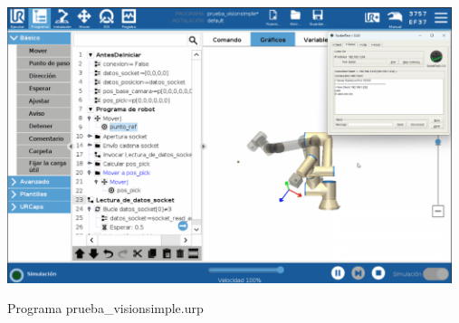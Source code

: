   \begin{table}[H]
     \centering
     \begin{center}
       \includegraphics[width=130mm]{figs/prueba_visionsimple.png}
     \end{center}
     \caption{Programa prueba\_visionsimple.urp}
     \label{fig:prueba_visionsimple}
  \end{table}
  


